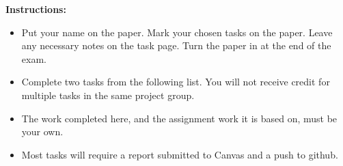 {\bf Instructions:}

\begin{itemize}

\item Put your name on the paper.  Mark your chosen tasks on the paper.  Leave any
      necessary notes on the task page.  Turn the paper in at the end of the exam.

\item Complete two tasks from the following list. You will not receive credit for
      multiple tasks in the same project group.

\item The work completed here, and the assignment work it is based on, must be your own.

\item Most tasks will require a report submitted to Canvas and a push to github.

\end{itemize}

